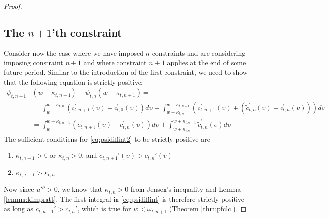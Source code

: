 \documentclass[titlepage]{\econtex}
\providecommand{\wAlt}{\omega}
\begin{document}
\begin{proof}
\subsection*{The $n+1$'th constraint}
Consider now the case where we have imposed $n$ constraints and are considering imposing constraint $n+1$ and where constraint $n+1$ applies at the end of some future period. Similar to the introduction of the first constraint, we need to show that the following equation is strictly positive:
\begin{align}
\psi_{t,n+1}&({w}+\kappa_{t,n+1}) - \psi_{t,n}({w}+\kappa_{t,n+1}) = \nonumber\\ &=\int_{{w}}^{{w}+\kappa_{t,n}} (c_{t,n+1}^{\prime}(\upsilon)-c_{t,0}^{\prime}(\upsilon))d\upsilon+\int^{{w}+\kappa_{t,n+1}}_{{w}+\kappa_{t,n}} \left(c_{t,n+1}^{\prime}(\upsilon)+(\tilde{c}_{t,n}^{\prime}(\upsilon)-c_{t,n}^{\prime}(\upsilon)) \right) d\upsilon \nonumber \\
&= \int_{{w}}^{{w}+\kappa_{t,n+1}}
(c_{t,n+1}^{\prime}(\upsilon)-c_{t,n}^{\prime}(\upsilon))d\upsilon +\int^{{w}+\kappa_{t,n+1}}_{{w}+\kappa_{t,n}}
\tilde{c}_{t,n}^{\prime}(\upsilon) d\upsilon \label{eq:psidiffint2}
\end{align}
The sufficient conditions for \eqref{eq:psidiffint2} to be strictly positive are
\begin{enumerate}
	\item $\kappa_{t,n+1} > 0$ or $\kappa_{t,n} > 0$, and $c_{t,n+1}'(\upsilon) > c_{t,n}'(\upsilon)$
	\item $\kappa_{t,n+1} > \kappa_{t,n}$
\end{enumerate}

	Now since $u'''>0$, we know that $\kappa_{t,n} > 0$ from Jensen's inequality and Lemma \ref{lemma:kimpratt}. The first integral in \eqref{eq:psidiffint} is therefore strictly positive as long as $c_{t,n+1}' > c_{t,n}'$, which is true for ${w} < \wAlt_{t,n+1}$ (Theorem \ref{thm:pfclc}). 
	

\end{proof}
\end{document}
